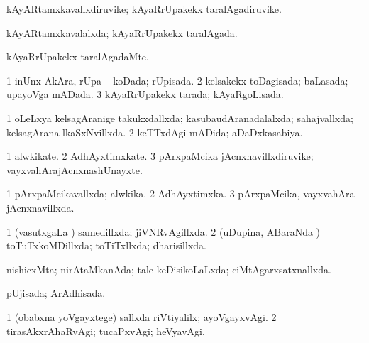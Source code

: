 {{\bentry
{} 
\gl{\nA}
\expl{}
\bmng
kAyARtamxkavallxdiruvike; kAyaRrUpakekx taralAgadiruvike. 
\emng
\eentry

\bentry
{} 
\gl{\gu}
\expl{}
\bmng
kAyARtamxkavalalxda; kAyaRrUpakekx taralAgada. 
\emng
\eentry

\bentry
{} 
\gl{\nA}
\expl{}
\bmng
{} 
\emng
\eentry

\bentry
{} 
\gl{\kirxvi}
\expl{}
\bmng
kAyaRrUpakekx taralAgadaMte. 
\emng
\eentry

\bentry
{} 
\gl{\gu}
\expl{}
\bmng
\bnum
\num{1} inUnx AkAra, rUpa -- koDada; rUpisada. 
\num{2} kelsakekx toDagisada; baLasada; upayoVga mADada. 
\num{3} kAyaRrUpakekx tarada; kAyaRgoLisada. 
\enum
\emng
\eentry

\bentry
{} 
\gl{\gu}
\expl{}
\bmng
\bnum
\num{1} oLeLxya kelsagAranige takukxdallxda; kasubaudAranadalalxda; sahajvallxda; kelsagArana lkaSxNvillxda. 
\num{2} keTTxdAgi mADida; aDaDxkasabiya. 
\enum
\emng
\eentry

\bentry
{} 
\gl{\nA}
\expl{}
\bmng
\bnum
\num{1} alwkikate. 
\num{2} AdhAyxtimxkate. 
\num{3} pArxpaMcika jAcnxnavillxdiruvike; vayxvahArajAcnxnashUnayxte. 
\enum
\emng
\eentry

\bentry
{} 
\gl{\gu}
\expl{}
\bmng
\bnum
\num{1} pArxpaMcikavallxda; alwkika. 
\num{2} AdhAyxtimxka. 
\num{3} pArxpaMcika, vayxvahAra -- jAcnxnavillxda. 
\enum
\emng
\eentry

\bentry
{} 
\gl{\gu}
\expl{}
\bmng
\bnum
\num{1} (vasutxgaLa \vi) samedillxda; jiVNRvAgillxda. 
\num{2} (uDupina, ABaraNda \vi) toTuTxkoMDillxda; toTiTxllxda; dharisillxda. 
\enum
\emng
\eentry

\bentry
{} 
\gl{\gu}
\expl{}
\bmng
nishicxMta; nirAtaMkanAda; tale keDisikoLaLxda; ciMtAgarxsatxnallxda. 
\emng
\eentry

\bentry
{} 
\gl{\gu}
\expl{}
\bmng
pUjisada; ArAdhisada. 
\emng
\eentry

\bentry
{} 
\gl{\kirxvi}
\expl{}
\bmng
\bnum
\num{1} (obabxna yoVgayxtege) sallxda riVtiyalilx; ayoVgayxvAgi. 
\num{2} tirasAkxrAhaRvAgi; tucaPxvAgi; heVyavAgi. 
\enum
\emng
\eentry

}}
